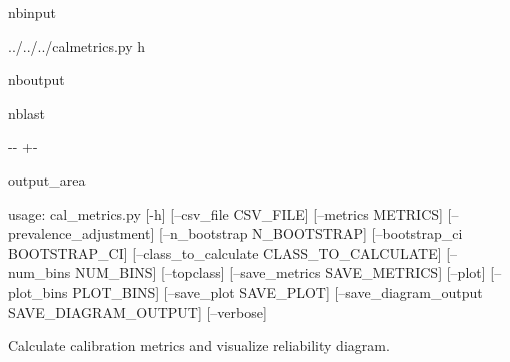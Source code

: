 \documentclass[letterpaper,10pt,english]{sphinxmanual}
\begin{document}
\begin{sphinxuseclass}{nbinput}
{
\begin{sphinxVerbatim}[commandchars=\\\{\}]
\llap{\color{nbsphinxin}[1]:\,\hspace{\fboxrule}\hspace{\fboxsep}}
 ../../../cal\PYGZus{}metrics.py \PYGZhy{}h
\end{sphinxVerbatim}
}

\end{sphinxuseclass}
\begin{sphinxuseclass}{nboutput}
\begin{sphinxuseclass}{nblast}
{

\kern-\sphinxverbatimsmallskipamount\kern-\baselineskip
\kern+\FrameHeightAdjust\kern-\fboxrule
\vspace{\nbsphinxcodecellspacing}

\begin{sphinxuseclass}{output_area}
\begin{sphinxuseclass}{}


\begin{sphinxVerbatim}[commandchars=\\\{\}]
usage: cal\_metrics.py [-h] [--csv\_file CSV\_FILE] [--metrics METRICS]
                      [--prevalence\_adjustment] [--n\_bootstrap N\_BOOTSTRAP]
                      [--bootstrap\_ci BOOTSTRAP\_CI]
                      [--class\_to\_calculate CLASS\_TO\_CALCULATE]
                      [--num\_bins NUM\_BINS] [--topclass]
                      [--save\_metrics SAVE\_METRICS] [--plot]
                      [--plot\_bins PLOT\_BINS] [--save\_plot SAVE\_PLOT]
                      [--save\_diagram\_output SAVE\_DIAGRAM\_OUTPUT] [--verbose]

Calculate calibration metrics and visualize reliability diagram.


\end{sphinxVerbatim}
\end{sphinxuseclass}
\end{sphinxuseclass}}
\end{sphinxuseclass}
\end{sphinxuseclass}
\end{document}
